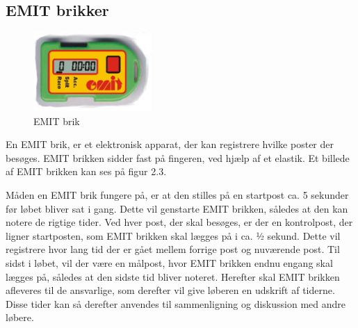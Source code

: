 \subsection{EMIT brikker}
\begin{figure}
	\vspace{5pt}
	\begin{center}
		\includegraphics[width=0.4\textwidth]{billeder/emitbrik}
	\end{center}
	\vspace{-20pt}
	\caption{EMIT brik}
	\vspace{-10pt}
\end{figure}
En EMIT brik, er et elektronisk apparat, der kan registrere hvilke poster der besøges. EMIT brikken sidder fast på fingeren, ved hjælp af et elastik. Et billede af EMIT brikken kan ses på figur 2.3.

Måden en EMIT brik fungere på, er at den stilles på en startpost ca. 5 sekunder før løbet bliver sat i gang. Dette vil genstarte EMIT brikken, således at den kan notere de rigtige tider. 
Ved hver post, der skal besøges, er der en kontrolpost, der ligner startposten, som EMIT brikken skal lægges på i ca. ½ sekund. Dette vil registrere hvor lang tid der er gået mellem forrige post og nuværende post. \newline
Til sidst i løbet, vil der være en målpost, hvor EMIT brikken endnu engang skal lægges på, således at den sidste tid bliver noteret. 
Herefter skal EMIT brikken afleveres til de ansvarlige, som derefter vil give løberen en udskrift af tiderne. Disse tider kan så derefter anvendes til sammenligning og diskussion med andre løbere. \citep{OOK}


